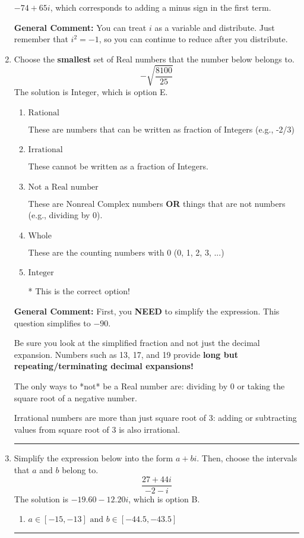 \documentclass{extbook}[14pt]
\newcommand{\litem}[1]{\item #1

\rule{\textwidth}{0.4pt}}
\begin{document}
\begin{enumerate}
{\begin{enumerate}[label=\Alph*.]
 $-74 + 65 i$, which corresponds to adding a minus sign in the first term.
\end{enumerate}

\textbf{General Comment:} You can treat $i$ as a variable and distribute. Just remember that $i^2=-1$, so you can continue to reduce after you distribute.
}
\litem{
Choose the \textbf{smallest} set of Real numbers that the number below belongs to.
\[ -\sqrt{\frac{8100}{25}} \]The solution is \( \text{Integer} \), which is option E.\begin{enumerate}[label=\Alph*.]
\item \( \text{Rational} \)

These are numbers that can be written as fraction of Integers (e.g., -2/3)
\item \( \text{Irrational} \)

These cannot be written as a fraction of Integers.
\item \( \text{Not a Real number} \)

These are Nonreal Complex numbers \textbf{OR} things that are not numbers (e.g., dividing by 0).
\item \( \text{Whole} \)

These are the counting numbers with 0 (0, 1, 2, 3, ...)
\item \( \text{Integer} \)

* This is the correct option!
\end{enumerate}

\textbf{General Comment:} First, you \textbf{NEED} to simplify the expression. This question simplifies to $-90$. 
 
 Be sure you look at the simplified fraction and not just the decimal expansion. Numbers such as 13, 17, and 19 provide \textbf{long but repeating/terminating decimal expansions!} 
 
 The only ways to *not* be a Real number are: dividing by 0 or taking the square root of a negative number. 
 
 Irrational numbers are more than just square root of 3: adding or subtracting values from square root of 3 is also irrational.
}
\litem{
Simplify the expression below into the form $a+bi$. Then, choose the intervals that $a$ and $b$ belong to.
\[ \frac{27 + 44 i}{-2 - i} \]The solution is \( -19.60  - 12.20 i \), which is option B.\begin{enumerate}[label=\Alph*.]
\item \( a \in [-15, -13] \text{ and } b \in [-44.5, -43.5] \)


\end{enumerate}}
\end{enumerate}
\end{document}
